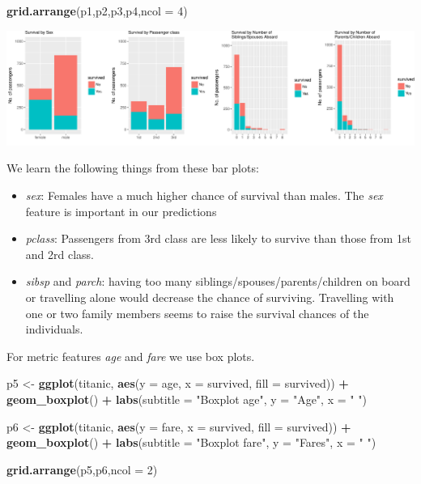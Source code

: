 \documentclass[12,]{article}
\newenvironment{Shaded}{\begin{snugshade}}{\end{snugshade}}
\newcommand{\KeywordTok}[1]{\textcolor[rgb]{0.13,0.29,0.53}{\textbf{#1}}}
\newcommand{\DataTypeTok}[1]{\textcolor[rgb]{0.13,0.29,0.53}{#1}}
\newcommand{\DecValTok}[1]{\textcolor[rgb]{0.00,0.00,0.81}{#1}}
\newcommand{\StringTok}[1]{\textcolor[rgb]{0.31,0.60,0.02}{#1}}
\newcommand{\OperatorTok}[1]{\textcolor[rgb]{0.81,0.36,0.00}{\textbf{#1}}}
\newcommand{\NormalTok}[1]{#1}
\providecommand{\tightlist}{%
  \setlength{\itemsep}{0pt}\setlength{\parskip}{0pt}}
\begin{document}
\begin{Shaded}
\begin{Highlighting}[]
\KeywordTok{grid.arrange}\NormalTok{(p1,p2,p3,p4,}\DataTypeTok{ncol =} \DecValTok{4}\NormalTok{)}
\end{Highlighting}
\end{Shaded}

\includegraphics{Seminararbeit_1_Gruppe_2_files/figure-latex/unnamed-chunk-7-1.pdf}

We learn the following things from these bar plots:

\begin{itemize}
\tightlist
\item
  \emph{sex}: Females have a much higher chance of survival than males.
  The \emph{sex} feature is important in our predictions
\item
  \emph{pclass}: Passengers from 3rd class are less likely to survive
  than those from 1st and 2rd class.
\item
  \emph{sibsp} and \emph{parch}: having too many
  siblings/spouses/parents/children on board or travelling alone would
  decrease the chance of surviving. Travelling with one or two family
  members seems to raise the survival chances of the individuals.
\end{itemize}

For metric features \emph{age} and \emph{fare} we use box plots.

\begin{Shaded}
\begin{Highlighting}[]
\NormalTok{p5 <-}\StringTok{ }\KeywordTok{ggplot}\NormalTok{(titanic, }\KeywordTok{aes}\NormalTok{(}\DataTypeTok{y =}\NormalTok{ age, }\DataTypeTok{x =}\NormalTok{ survived, }\DataTypeTok{fill =}\NormalTok{ survived)) }\OperatorTok{+}
\StringTok{    }\KeywordTok{geom_boxplot}\NormalTok{() }\OperatorTok{+}
\StringTok{    }\KeywordTok{labs}\NormalTok{(}\DataTypeTok{subtitle =} \StringTok{"Boxplot age"}\NormalTok{, }\DataTypeTok{y =} \StringTok{"Age"}\NormalTok{, }\DataTypeTok{x =} \StringTok{" "}\NormalTok{)}

\NormalTok{p6 <-}\StringTok{ }\KeywordTok{ggplot}\NormalTok{(titanic, }\KeywordTok{aes}\NormalTok{(}\DataTypeTok{y =}\NormalTok{ fare, }\DataTypeTok{x =}\NormalTok{ survived, }\DataTypeTok{fill =}\NormalTok{ survived)) }\OperatorTok{+}\StringTok{ }
\StringTok{    }\KeywordTok{geom_boxplot}\NormalTok{() }\OperatorTok{+}
\StringTok{    }\KeywordTok{labs}\NormalTok{(}\DataTypeTok{subtitle =} \StringTok{"Boxplot fare"}\NormalTok{, }\DataTypeTok{y =} \StringTok{"Fares"}\NormalTok{, }\DataTypeTok{x =} \StringTok{" "}\NormalTok{) }

\KeywordTok{grid.arrange}\NormalTok{(p5,p6,}\DataTypeTok{ncol =} \DecValTok{2}\NormalTok{)}
\end{Highlighting}
\end{Shaded}
\end{document}
